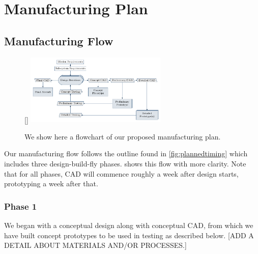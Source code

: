 \documentclass[proposal]{byu-aero}
\begin{document}

 \section{Manufacturing Plan} %
\label{sec:ManufacturingPlan}


\subsection{Manufacturing Flow}
\label{ssec:ManufacturingFlow}
\begin{figure}
	\centering
		\raisebox{0pt}[\dimexpr{}\baselineskip\relax]{
	\includegraphics[width=0.6\textwidth]{manufacturing_flow}}
	\caption{We show here a flowchart of our proposed manufacturing plan.}
	\label{fig:manufacturingplan}
\end{figure}

Our manufacturing flow follows the outline found in \cref{fig:plannedtiming} which includes three design-build-fly phases.   shows this flow with more clarity.  Note that for all phases, CAD will commence roughly a week after design starts, prototyping a week after that.

\subsubsection{Phase 1} We began with a conceptual design along with conceptual CAD, from which we have built concept prototypes to be used in testing as described below. {\color{BYUred}[ADD A DETAIL ABOUT MATERIALS AND/OR PROCESSES.]}
\end{document}
